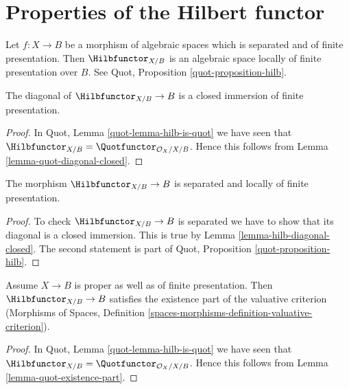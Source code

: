 \section{Properties of the Hilbert functor}
\label{section-hilb}

\noindent
Let $f : X \to B$ be a morphism of algebraic spaces which is
separated and of finite presentation. Then
$\Hilbfunctor_{X/B}$ is an algebraic space locally of finite
presentation over $B$. See Quot, Proposition \ref{quot-proposition-hilb}.

\begin{lemma}
\label{lemma-hilb-diagonal-closed}
The diagonal of $\Hilbfunctor_{X/B} \to B$ is a closed immersion
of finite presentation.
\end{lemma}

\begin{proof}
In Quot, Lemma \ref{quot-lemma-hilb-is-quot} we have seen that
$\Hilbfunctor_{X/B} = \Quotfunctor_{\mathcal{O}_X/X/B}$.
Hence this follows from Lemma \ref{lemma-quot-diagonal-closed}.
\end{proof}

\begin{lemma}
\label{lemma-hilb-s-lfp}
The morphism $\Hilbfunctor_{X/B} \to B$ is separated
and locally of finite presentation.
\end{lemma}

\begin{proof}
To check $\Hilbfunctor_{X/B} \to B$ is separated we have to
show that its diagonal is a closed immersion. This
is true by Lemma \ref{lemma-hilb-diagonal-closed}.
The second statement is part of
Quot, Proposition \ref{quot-proposition-hilb}.
\end{proof}

\begin{lemma}
\label{lemma-hilb-existence-part}
Assume $X \to B$ is proper as well as of finite presentation.
Then $\Hilbfunctor_{X/B} \to B$ satisfies the existence part
of the valuative criterion (Morphisms of Spaces, Definition
\ref{spaces-morphisms-definition-valuative-criterion}).
\end{lemma}

\begin{proof}
In Quot, Lemma \ref{quot-lemma-hilb-is-quot} we have seen that
$\Hilbfunctor_{X/B} = \Quotfunctor_{\mathcal{O}_X/X/B}$.
Hence this follows from Lemma \ref{lemma-quot-existence-part}.
\end{proof}










